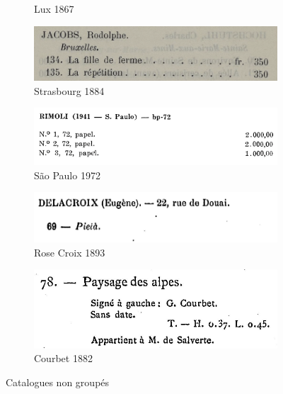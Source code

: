 \documentclass[a4paper,12pt,twoside]{book}
\begin{document}
\begin{figure}[ht]
\begin{subfigure}{0.5\textwidth}
		\centering
		\caption{Lux 1867}
	\end{subfigure}
	\begin{subfigure}{0.5\textwidth}
		\includegraphics[scale=0.5]{strasbourg1884.png}
		\centering
		\caption{Strasbourg 1884}
	\end{subfigure}
	\begin{subfigure}{0.5\textwidth}
	\includegraphics[scale=0.5]{saopaulo1972.png}
	\centering
	\caption{São Paulo 1972}
\end{subfigure}
	\begin{subfigure}{0.5\textwidth}
	\includegraphics[scale=0.5]{rosecroix1893.png}
	\centering
	\caption{Rose Croix 1893}
\end{subfigure}
\begin{subfigure}{0.5\textwidth}
	\includegraphics[scale=0.5]{courbet1882.png}
	\centering
	\caption{Courbet 1882}
\end{subfigure}


	\caption{Catalogues non groupés}
	
\end{figure}
\end{document}
